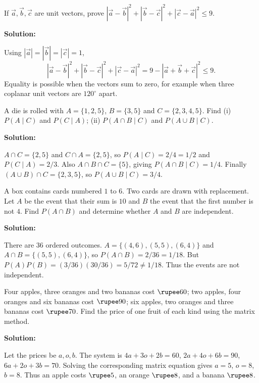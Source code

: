 \documentclass[journal]{IEEEtran}
\begin{document}
\begin{list}{}
\item[5.1.30.2] If $\vec a,\vec b,\vec c$ are unit vectors, prove $|\vec a-\vec b|^2+|\vec b-\vec c|^2+|\vec c-\vec a|^2\le9$.

\vspace{0.6em}\par\noindent\textbf{Solution:}

Using $|\vec a|=|\vec b|=|\vec c|=1$,
\[
|\vec a-\vec b|^2+|\vec b-\vec c|^2+|\vec c-\vec a|^2
=9-|\vec a+\vec b+\vec c|^2\le9.
\]
Equality is possible when the vectors sum to zero, for example when three coplanar unit vectors are $120^\circ$ apart.

\item[5.1.31.1] A die is rolled with $A=\{1,2,5\}$, $B=\{3,5\}$ and $C=\{2,3,4,5\}$. Find (i) $P(A\mid C)$ and $P(C\mid A)$; (ii) $P(A\cap B\mid C)$ and $P(A\cup B\mid C)$.

\vspace{0.6em}\par\noindent\textbf{Solution:}

$A\cap C=\{2,5\}$ and $C\cap A=\{2,5\}$, so $P(A\mid C)=2/4=1/2$ and $P(C\mid A)=2/3$. Also $A\cap B\cap C=\{5\}$, giving $P(A\cap B\mid C)=1/4$. Finally $(A\cup B)\cap C=\{2,3,5\}$, so $P(A\cup B\mid C)=3/4$.

\item[5.1.31.2] A box contains cards numbered $1$ to $6$. Two cards are drawn with replacement. Let $A$ be the event that their sum is $10$ and $B$ the event that the first number is not $4$. Find $P(A\cap B)$ and determine whether $A$ and $B$ are independent.

\vspace{0.6em}\par\noindent\textbf{Solution:}

There are $36$ ordered outcomes. $A=\{(4,6),(5,5),(6,4)\}$ and $A\cap B=\{(5,5),(6,4)\}$, so $P(A\cap B)=2/36=1/18$. But $P(A)P(B)=(3/36)(30/36)=5/72\ne1/18$. Thus the events are not independent.

\item[5.1.32] Four apples, three oranges and two bananas cost $\rupee 60$; two apples, four oranges and six bananas cost $\rupee 90$; six apples, two oranges and three bananas cost $\rupee 70$. Find the price of one fruit of each kind using the matrix method.

\vspace{0.6em}\par\noindent\textbf{Solution:}

Let the prices be $a,o,b$. The system is $4a+3o+2b=60$, $2a+4o+6b=90$, $6a+2o+3b=70$. Solving the corresponding matrix equation gives $a=5$, $o=8$, $b=8$. Thus an apple costs $\rupee 5$, an orange $\rupee 8$, and a banana $\rupee 8$.


\end{list}
\end{document}
